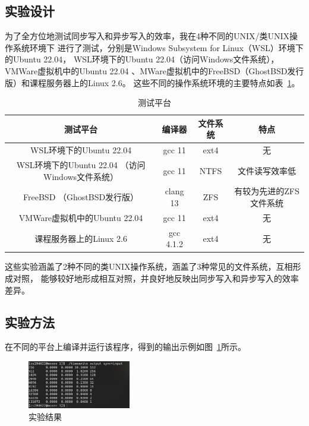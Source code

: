 \documentclass[a4paper,twoside]{article}
\begin{document}
\begin{spacing}{1.2}
\subsection{实验设计}

为了全方位地测试同步写入和异步写入的效率，我在4种不同的UNIX/类UNIX操作系统环境下
进行了测试，分别是Windows Subsystem for Linux（WSL）环境下的Ubuntu 22.04，
WSL环境下的Ubuntu 22.04（访问Windows文件系统），VMWare虚拟机中的Ubuntu 22.04
、MWare虚拟机中的FreeBSD（GhostBSD发行版）和课程服务器上的Linux 2.6。
这些不同的操作系统环境的主要特点如表~\ref{tbl:oss}。

\begin{table}[htbp]
	\centering
	\caption{测试平台}
	\label{tbl:oss}
	\begin{tabular}{c|c|c|c}
		\toprule
		\hline
		测试平台 & 编译器 & 文件系统 & 特点  \\
		\hline
		WSL环境下的Ubuntu 22.04 & gcc 11 & ext4 & 无 \\
		\hline
		WSL环境下的Ubuntu 22.04 （访问Windows文件系统） & gcc 11 & NTFS & 文件读写效率低\cite{githubwsl2Filesystem} \\
		\hline
		FreeBSD （GhostBSD发行版） & clang 13 & ZFS & 有较为先进的ZFS文件系统\cite{rodeh2003zfs} \\
		\hline
		VMWare虚拟机中的Ubuntu 22.04 & gcc 11 & ext4 & 无  \\
		\hline
		课程服务器上的Linux 2.6 & gcc 4.1.2 & ext4 & 无  \\
		\hline
		\bottomrule
	\end{tabular}
\end{table}

这些实验涵盖了2种不同的类UNIX操作系统，涵盖了3种常见的文件系统，互相形成对照，
能够较好地形成相互对照，并良好地反映出同步写入和异步写入的效率差异。

\subsection{实验方法}

在不同的平台上编译并运行该程序，得到的输出示例如图~\ref{fig:output}所示。

\begin{figure}[htbp]
	\centering
	\caption{实验结果}
	\label{fig:output}
	\includegraphics[width=0.4\textwidth]{output.png}
\end{figure}


\end{spacing}
\end{document}
